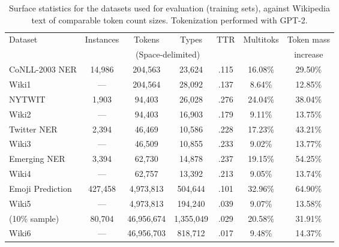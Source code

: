 \begin{table*}
    \centering
    \small
    \begin{tabular}{lcccccc} \toprule
        Dataset & Instances & Tokens & Types & TTR & Multitoks & Token mass \\
         & & \multicolumn{2}{c}{(Space-delimited)} & & & increase \\
        \midrule
        CoNLL-2003 NER & 14,986 & 204,563 & 23,624 & .115 & 16.08\% & 29.50\% \\
        Wiki1 & --- & 204,564 & 28,092 & .137 & 8.64\% & 12.85\% \\
        \midrule
        NYTWIT & 1,903 & 94,403 & 26,028 & .276 & 24.04\% & 38.04\% \\
        Wiki2 & --- & 94,403 & 16,903 & .179 & 9.11\% & 13.75\% \\
        \midrule
        Twitter NER & 2,394 & 46,469 & 10,586 & .228 & 17.23\% & 43.21\% \\
        Wiki3 & --- & 46,509 & 10,855 & .233 & 9.02\% & 13.77\% \\
        \midrule
        Emerging NER & 3,394 & 62,730 & 14,878 & .237 & 19.15\% & 54.25\% \\
        Wiki4 & --- & 62,757 & 13,392 & .213 & 9.05\% & 13.74\% \\
        \midrule
        Emoji Prediction & 427,458 & 4,973,813 & 504,644 & .101 & 32.96\% & 64.90\% \\ %
        Wiki5 & --- & 4,973,813 & 194,240 & .039 & 9.07\% & 13.58\% \\ %
        \midrule
        \marco{} (10\% sample) & 80,704 & 46,956,674 & 1,355,049 & .029 & 20.58\% & 31.91\% \\ %
        Wiki6 & --- & 46,956,703 & 818,712 & .017 & 9.48\% & 14.37\% \\
        \bottomrule
    \end{tabular}
    \caption{Surface statistics for the datasets used for evaluation (training sets), against Wikipedia text of comparable token count sizes. Tokenization performed with GPT-2.}
    \label{tab:stats}
\end{table*}
